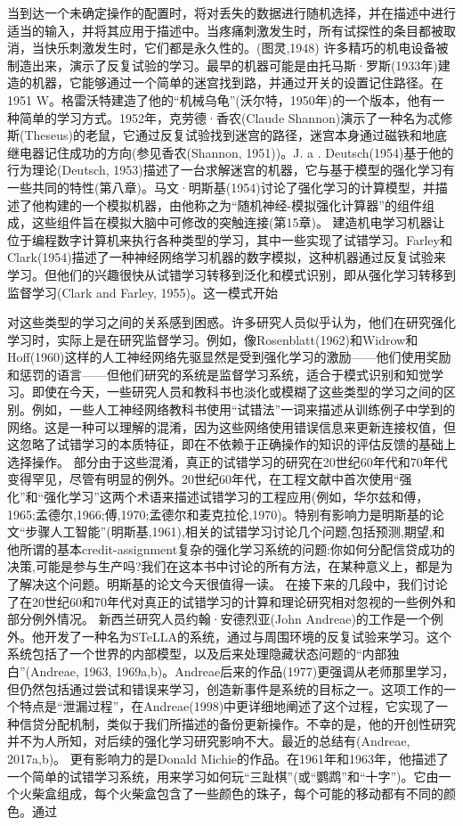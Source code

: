 当到达一个未确定操作的配置时，将对丢失的数据进行随机选择，并在描述中进行适当的输入，并将其应用于描述中。当疼痛刺激发生时，所有试探性的条目都被取消，当快乐刺激发生时，它们都是永久性的。(图灵,1948)
许多精巧的机电设备被制造出来，演示了反复试验的学习。最早的机器可能是由托马斯·罗斯(1933年)建造的机器，它能够通过一个简单的迷宫找到路，并通过开关的设置记住路径。在1951 W。格雷沃特建造了他的“机械乌龟”(沃尔特，1950年)的一个版本，他有一种简单的学习方式。1952年，克劳德·香农(Claude Shannon)演示了一种名为忒修斯(Theseus)的老鼠，它通过反复试验找到迷宫的路径，迷宫本身通过磁铁和地底继电器记住成功的方向(参见香农(Shannon, 1951))。J. a . Deutsch(1954)基于他的行为理论(Deutsch, 1953)描述了一台求解迷宫的机器，它与基于模型的强化学习有一些共同的特性(第八章)。马文·明斯基(1954)讨论了强化学习的计算模型，并描述了他构建的一个模拟机器，由他称之为“随机神经-模拟强化计算器”的组件组成，这些组件旨在模拟大脑中可修改的突触连接(第15章)。
建造机电学习机器让位于编程数字计算机来执行各种类型的学习，其中一些实现了试错学习。Farley和Clark(1954)描述了一种神经网络学习机器的数字模拟，这种机器通过反复试验来学习。但他们的兴趣很快从试错学习转移到泛化和模式识别，即从强化学习转移到监督学习(Clark and Farley, 1955)。这一模式开始

对这些类型的学习之间的关系感到困惑。许多研究人员似乎认为，他们在研究强化学习时，实际上是在研究监督学习。例如，像Rosenblatt(1962)和Widrow和Hoff(1960)这样的人工神经网络先驱显然是受到强化学习的激励——他们使用奖励和惩罚的语言——但他们研究的系统是监督学习系统，适合于模式识别和知觉学习。即使在今天，一些研究人员和教科书也淡化或模糊了这些类型的学习之间的区别。例如，一些人工神经网络教科书使用“试错法”一词来描述从训练例子中学到的网络。这是一种可以理解的混淆，因为这些网络使用错误信息来更新连接权值，但这忽略了试错学习的本质特征，即在不依赖于正确操作的知识的评估反馈的基础上选择操作。
部分由于这些混淆，真正的试错学习的研究在20世纪60年代和70年代变得罕见，尽管有明显的例外。20世纪60年代，在工程文献中首次使用“强化”和“强化学习”这两个术语来描述试错学习的工程应用(例如，华尔兹和傅，1965;孟德尔,1966;傅,1970;孟德尔和麦克拉伦,1970)。特别有影响力是明斯基的论文“步骤人工智能”(明斯基,1961),相关的试错学习讨论几个问题,包括预测,期望,和他所谓的基本credit-assignment复杂的强化学习系统的问题:你如何分配信贷成功的决策,可能是参与生产吗?我们在这本书中讨论的所有方法，在某种意义上，都是为了解决这个问题。明斯基的论文今天很值得一读。
在接下来的几段中，我们讨论了在20世纪60和70年代对真正的试错学习的计算和理论研究相对忽视的一些例外和部分例外情况。
新西兰研究人员约翰·安德烈亚(John Andreae)的工作是一个例外。他开发了一种名为STeLLA的系统，通过与周围环境的反复试验来学习。这个系统包括了一个世界的内部模型，以及后来处理隐藏状态问题的“内部独白”(Andreae, 1963, 1969a,b)。Andreae后来的作品(1977)更强调从老师那里学习，但仍然包括通过尝试和错误来学习，创造新事件是系统的目标之一。这项工作的一个特点是“泄漏过程”，在Andreae(1998)中更详细地阐述了这个过程，它实现了一种信贷分配机制，类似于我们所描述的备份更新操作。不幸的是，他的开创性研究并不为人所知，对后续的强化学习研究影响不大。最近的总结有(Andreae, 2017a,b)。
更有影响力的是Donald Michie的作品。在1961年和1963年，他描述了一个简单的试错学习系统，用来学习如何玩“三趾棋”(或“鹦鹉”和“十字”)。它由一个火柴盒组成，每个火柴盒包含了一些颜色的珠子，每个可能的移动都有不同的颜色。通过

